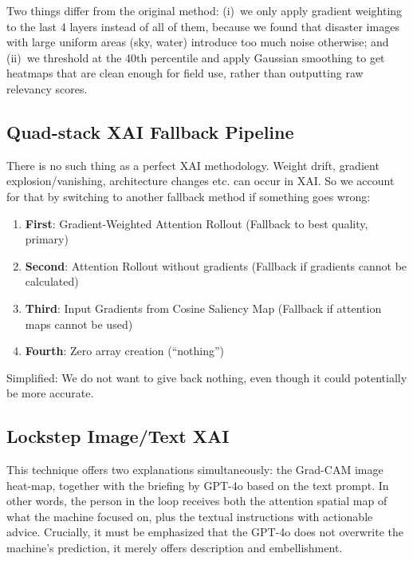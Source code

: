 \documentclass[journal]{IEEEtran}
\begin{document}
Two things differ from the original method: (i)~we only apply gradient weighting to the last 4 layers instead of all of them, because we found that disaster images with large uniform areas (sky, water) introduce too much noise otherwise; and (ii)~we threshold at the 40th percentile and apply Gaussian smoothing to get heatmaps that are clean enough for field use, rather than outputting raw relevancy scores.

\subsection{Quad-stack XAI Fallback Pipeline}

There is no such thing as a perfect XAI methodology. Weight drift, gradient explosion/vanishing, architecture changes etc. can occur in XAI. So we account for that by switching to another fallback method if something goes wrong:

\begin{enumerate}
    \item \textbf{First}: Gradient-Weighted Attention Rollout (Fallback to best quality, primary)
    \item \textbf{Second}: Attention Rollout without gradients (Fallback if gradients cannot be calculated)
    \item \textbf{Third}: Input Gradients from Cosine Saliency Map (Fallback if attention maps cannot be used)
    \item \textbf{Fourth}: Zero array creation (``nothing'')
\end{enumerate}

Simplified: We do not want to give back nothing, even though it could potentially be more accurate.

\subsection{Lockstep Image/Text XAI}

This technique offers two explanations simultaneously: the Grad-CAM image heat-map, together with the briefing by GPT-4o based on the text prompt. In other words, the person in the loop receives both the attention spatial map of what the machine focused on, plus the textual instructions with actionable advice. Crucially, it must be emphasized that the GPT-4o does not overwrite the machine's prediction, it merely offers description and embellishment.

\end{document}
